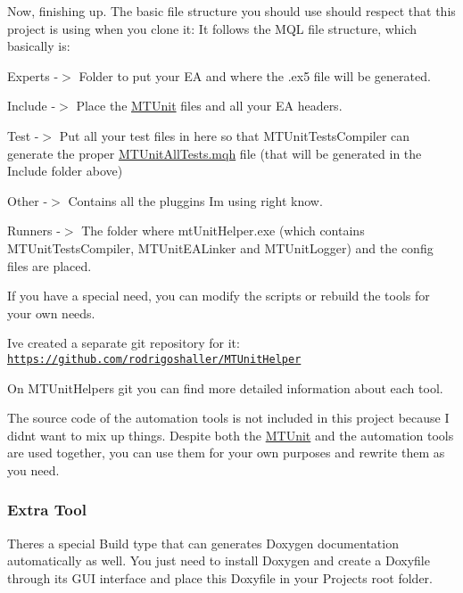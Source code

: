 Now, finishing up. The basic file structure you should use should respect that this project is using when you clone it\+: It follows the M\+QL file structure, which basically is\+:
\begin{DoxyItemize}
\item Experts -\/$>$ Folder to put your EA and where the .ex5 file will be generated.
\item Include -\/$>$ Place the \mbox{\hyperlink{class_m_t_unit}{M\+T\+Unit}} files and all your EA headers.
\item Test -\/$>$ Put all your test files in here so that M\+T\+Unit\+Tests\+Compiler can generate the proper \mbox{\hyperlink{_m_t_unit_all_tests_8mqh}{M\+T\+Unit\+All\+Tests.\+mqh}} file (that will be generated in the Include folder above)
\item Other -\/$>$ Contains all the pluggins I\textquotesingle{}m using right know.
\item Runners -\/$>$ The folder where mt\+Unit\+Helper.\+exe (which contains M\+T\+Unit\+Tests\+Compiler, M\+T\+Unit\+E\+A\+Linker and M\+T\+Unit\+Logger) and the config files are placed.
\end{DoxyItemize}

If you have a special need, you can modify the scripts or rebuild the tools for your own needs.

I\textquotesingle{}ve created a separate git repository for it\+: \href{https://github.com/rodrigoshaller/MTUnitHelper}{\tt https\+://github.\+com/rodrigoshaller/\+M\+T\+Unit\+Helper}

On M\+T\+Unit\+Helper\textquotesingle{}s git you can find more detailed information about each tool.

The source code of the automation tools is not included in this project because I didn\textquotesingle{}t want to mix up things. Despite both the \mbox{\hyperlink{class_m_t_unit}{M\+T\+Unit}} and the automation tools are used together, you can use them for your own purposes and rewrite them as you need.





\subsubsection*{Extra Tool}

There\textquotesingle{}s a special Build type that can generates Doxygen documentation automatically as well. You just need to install Doxygen and create a Doxyfile through its G\+UI interface and place this Doxyfile in your Project\textquotesingle{}s root folder.

